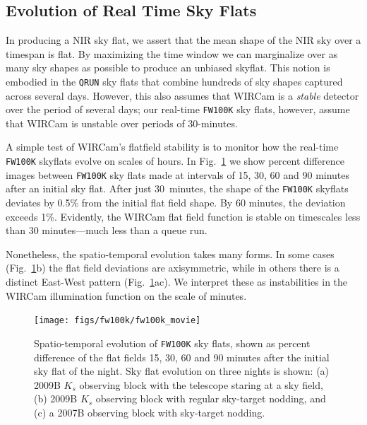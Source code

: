 \documentclass[iop]{emulateapj}
\newcommand{\Fig}[1]{Fig.~\ref{fig:#1}}  %
\begin{document}
\subsection{Evolution of Real Time Sky Flats} %
\label{sec:flatevo}

In producing a NIR sky flat, we assert that the mean shape of the NIR sky over a timespan is flat.
By maximizing the time window we can marginalize over as many sky shapes as possible to produce an unbiased skyflat.
This notion is embodied in the \texttt{QRUN} sky flats that combine hundreds of sky shapes captured across several days.
However, this also assumes that WIRCam is a \emph{stable} detector over the period of several days; our real-time \texttt{FW100K} sky flats, however, assume that WIRCam is unstable over periods of 30-minutes.

A simple test of WIRCam's flatfield stability is to monitor how the real-time \texttt{FW100K} skyflats evolve on scales of hours.
In \Fig{fw100k_movie} we show percent difference images between \texttt{FW100K} sky flats made at intervals of 15, 30, 60 and 90 minutes after an initial sky flat.
After just 30~minutes, the shape of the \texttt{FW100K} skyflats deviates by 0.5\% from the initial flat field shape.
By 60 minutes, the deviation exceeds 1\%.
Evidently, the WIRCam flat field function is stable on timescales less than 30 minutes---much less than a queue run.

Nonetheless, the spatio-temporal evolution takes many forms.
In some cases (\Fig{fw100k_movie}b) the flat field deviations are axisymmetric, while in others there is a distinct East-West pattern (\Fig{fw100k_movie}ac).
We interpret these as instabilities in the WIRCam illumination function on the scale of minutes.

\begin{figure}[t]
\centering
\texttt{[image: figs/fw100k/fw100k\_movie]}
\caption{Spatio-temporal evolution of \texttt{FW100K} sky flats, shown as percent difference of the flat fields 15, 30, 60 and 90 minutes after the initial sky flat of the night.
Sky flat evolution on three nights is shown: (a) 2009B $K_s$ observing block with the telescope staring at a sky field, (b) 2009B $K_s$ observing block with regular sky-target nodding, and (c) a 2007B observing block with sky-target nodding.}
\label{fig:fw100k_movie}
\end{figure}
\end{document}
